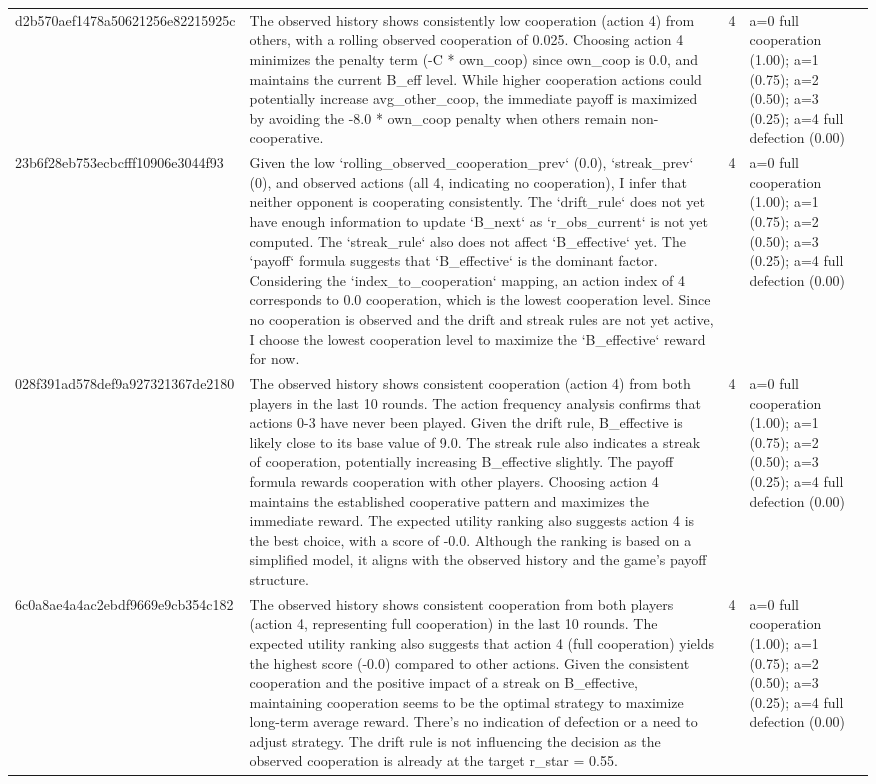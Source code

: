 \begin{tabular}{lp{8cm}ll l}
d2b570aef1478a50621256e82215925c & The observed history shows consistently low cooperation (action 4) from others, with a rolling observed cooperation of 0.025. Choosing action 4 minimizes the penalty term (-C * own\_coop) since own\_coop is 0.0, and maintains the current B\_eff level. While higher cooperation actions could potentially increase avg\_other\_coop, the immediate payoff is maximized by avoiding the -8.0 * own\_coop penalty when others remain non-cooperative. & 4 & a=0 full cooperation (1.00); a=1 (0.75); a=2 (0.50); a=3 (0.25); a=4 full defection (0.00) &  \\
23b6f28eb753ecbcfff10906e3044f93 & Given the low `rolling\_observed\_cooperation\_prev` (0.0), `streak\_prev` (0), and observed actions (all 4, indicating no cooperation), I infer that neither opponent is cooperating consistently. The `drift\_rule` does not yet have enough information to update `B\_next` as `r\_obs\_current` is not yet computed. The `streak\_rule` also does not affect `B\_effective` yet. The `payoff` formula suggests that `B\_effective` is the dominant factor. Considering the `index\_to\_cooperation` mapping, an action index of 4 corresponds to 0.0 cooperation, which is the lowest cooperation level. Since no cooperation is observed and the drift and streak rules are not yet active, I choose the lowest cooperation level to maximize the `B\_effective` reward for now. & 4 & a=0 full cooperation (1.00); a=1 (0.75); a=2 (0.50); a=3 (0.25); a=4 full defection (0.00) &  \\
028f391ad578def9a927321367de2180 & The observed history shows consistent cooperation (action 4) from both players in the last 10 rounds. The action frequency analysis confirms that actions 0-3 have never been played. Given the drift rule, B\_effective is likely close to its base value of 9.0. The streak rule also indicates a streak of cooperation, potentially increasing B\_effective slightly. The payoff formula rewards cooperation with other players. Choosing action 4 maintains the established cooperative pattern and maximizes the immediate reward. The expected utility ranking also suggests action 4 is the best choice, with a score of -0.0. Although the ranking is based on a simplified model, it aligns with the observed history and the game's payoff structure. & 4 & a=0 full cooperation (1.00); a=1 (0.75); a=2 (0.50); a=3 (0.25); a=4 full defection (0.00) &  \\
6c0a8ae4a4ac2ebdf9669e9cb354c182 & The observed history shows consistent cooperation from both players (action 4, representing full cooperation) in the last 10 rounds. The expected utility ranking also suggests that action 4 (full cooperation) yields the highest score (-0.0) compared to other actions. Given the consistent cooperation and the positive impact of a streak on B\_effective, maintaining cooperation seems to be the optimal strategy to maximize long-term average reward. There's no indication of defection or a need to adjust strategy. The drift rule is not influencing the decision as the observed cooperation is already at the target r\_star = 0.55. & 4 & a=0 full cooperation (1.00); a=1 (0.75); a=2 (0.50); a=3 (0.25); a=4 full defection (0.00) &  \\

\end{tabular}
